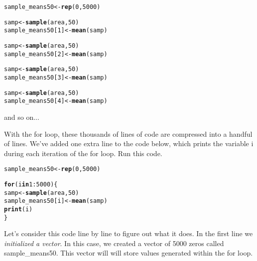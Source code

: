 \documentclass{article}\usepackage[]{graphicx}\usepackage[]{color}
\makeatletter
\newcommand{\hlnum}[1]{\textcolor[rgb]{0.686,0.059,0.569}{#1}}%
\newcommand{\hlopt}[1]{\textcolor[rgb]{0,0,0}{#1}}%
\newcommand{\hlstd}[1]{\textcolor[rgb]{0.345,0.345,0.345}{#1}}%
\newcommand{\hlkwa}[1]{\textcolor[rgb]{0.161,0.373,0.58}{\textbf{#1}}}%
\newcommand{\hlkwb}[1]{\textcolor[rgb]{0.69,0.353,0.396}{#1}}%
\newcommand{\hlkwd}[1]{\textcolor[rgb]{0.737,0.353,0.396}{\textbf{#1}}}%
\newenvironment{kframe}{%
 \def\at@end@of@kframe{}%
 \ifinner\ifhmode%
  \def\at@end@of@kframe{\end{minipage}}%
  \begin{minipage}{\columnwidth}%
 \fi\fi%
 \def\FrameCommand##1{\hskip\@totalleftmargin \hskip-\fboxsep
 \colorbox{shadecolor}{##1}\hskip-\fboxsep
     \hskip-\linewidth \hskip-\@totalleftmargin \hskip\columnwidth}%
 \MakeFramed {\advance\hsize-\width
   \@totalleftmargin\z@ \linewidth\hsize
   \@setminipage}}%
 {\par\unskip\endMakeFramed%
 \at@end@of@kframe}
\newenvironment{knitrout}{}{} %
\makeatother
\begin{document}
\begin{knitrout}
\color{fgcolor}\begin{kframe}
\begin{alltt}
\hlstd{sample_means50} \hlkwb{<-} \hlkwd{rep}\hlstd{(}\hlnum{0}\hlstd{,} \hlnum{5000}\hlstd{)}

\hlstd{samp} \hlkwb{<-} \hlkwd{sample}\hlstd{(area,} \hlnum{50}\hlstd{)}
\hlstd{sample_means50[}\hlnum{1}\hlstd{]} \hlkwb{<-} \hlkwd{mean}\hlstd{(samp)}

\hlstd{samp} \hlkwb{<-} \hlkwd{sample}\hlstd{(area,} \hlnum{50}\hlstd{)}
\hlstd{sample_means50[}\hlnum{2}\hlstd{]} \hlkwb{<-} \hlkwd{mean}\hlstd{(samp)}

\hlstd{samp} \hlkwb{<-} \hlkwd{sample}\hlstd{(area,} \hlnum{50}\hlstd{)}
\hlstd{sample_means50[}\hlnum{3}\hlstd{]} \hlkwb{<-} \hlkwd{mean}\hlstd{(samp)}

\hlstd{samp} \hlkwb{<-} \hlkwd{sample}\hlstd{(area,} \hlnum{50}\hlstd{)}
\hlstd{sample_means50[}\hlnum{4}\hlstd{]} \hlkwb{<-} \hlkwd{mean}\hlstd{(samp)}
\end{alltt}
\end{kframe}
\end{knitrout}


and so on...

With the for loop, these thousands of lines of code are compressed into a handful of lines. We've added one extra line to the code below, which prints the variable \hlstd{i} during each iteration of the for loop. Run this code.

\begin{knitrout}
\color{fgcolor}\begin{kframe}
\begin{alltt}
\hlstd{sample_means50} \hlkwb{<-} \hlkwd{rep}\hlstd{(}\hlnum{0}\hlstd{,} \hlnum{5000}\hlstd{)}

\hlkwa{for} \hlstd{(i} \hlkwa{in} \hlnum{1}\hlopt{:}\hlnum{5000}\hlstd{) \{}
    \hlstd{samp} \hlkwb{<-} \hlkwd{sample}\hlstd{(area,} \hlnum{50}\hlstd{)}
    \hlstd{sample_means50[i]} \hlkwb{<-} \hlkwd{mean}\hlstd{(samp)}
    \hlkwd{print}\hlstd{(i)}
\hlstd{\}}
\end{alltt}
\end{kframe}
\end{knitrout}


Let's consider this code line by line to figure out what it does.  In the first line we \emph{initialized a vector}.  In this case, we created a vector of 5000 zeros called \hlstd{sample\_means50}.  This vector will will store values generated within the for loop.
\end{document}
